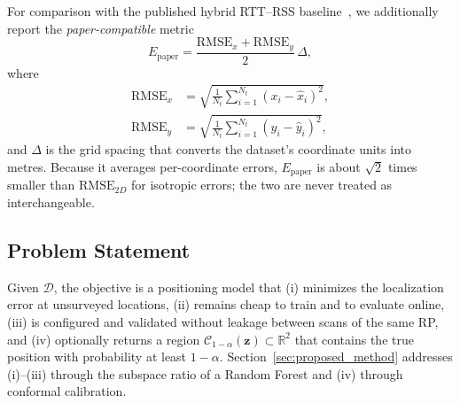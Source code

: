 For comparison with the published hybrid RTT--RSS baseline~\cite{feng2026robust}, we additionally report the \emph{paper-compatible} metric
\begin{equation}
	E_{\mathrm{paper}}
	=
	\frac{\mathrm{RMSE}_{x}+\mathrm{RMSE}_{y}}{2}\,\Delta,
	\label{eq:paper_metric}
\end{equation}
where
\begin{align}
	\mathrm{RMSE}_{x}&=\sqrt{\frac{1}{N_t}\sum_{i=1}^{N_t}(x_i-\hat{x}_i)^{2}},\\
	\mathrm{RMSE}_{y}&=\sqrt{\frac{1}{N_t}\sum_{i=1}^{N_t}(y_i-\hat{y}_i)^{2}},
\end{align}
and $\Delta$ is the grid spacing that converts the dataset's coordinate units into metres. Because it averages per-coordinate errors, $E_{\mathrm{paper}}$ is about $\sqrt{2}$ times smaller than $\mathrm{RMSE}_{2D}$ for isotropic errors; the two are never treated as interchangeable.

\subsection{Problem Statement}

Given $\mathcal{D}$, the objective is a positioning model that (i) minimizes the localization error at unsurveyed locations, (ii) remains cheap to train and to evaluate online, (iii) is configured and validated without leakage between scans of the same RP, and (iv) optionally returns a region $\mathcal{C}_{1-\alpha}(\mathbf{z})\subset\mathbb{R}^{2}$ that contains the true position with probability at least $1-\alpha$. Section~\ref{sec:proposed_method} addresses (i)--(iii) through the subspace ratio of a Random Forest and (iv) through conformal calibration.
